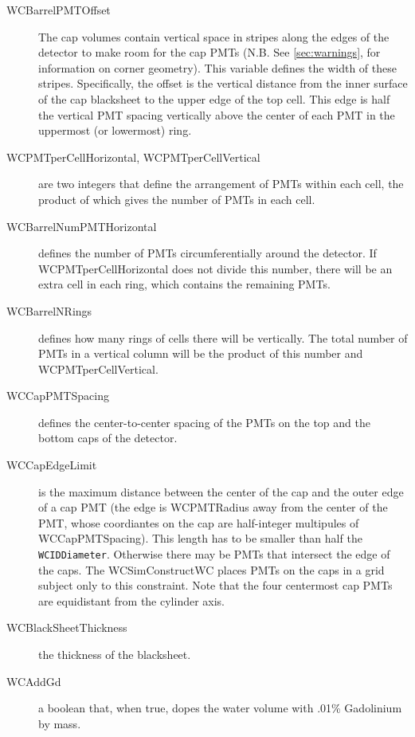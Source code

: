 \begin{description}
\item[WCBarrelPMTOffset] The cap volumes contain vertical space in stripes along the edges of the detector to make room for the cap PMTs (N.B.  See \ref{sec:warnings}, for information on corner geometry). This variable defines the width of these stripes.  Specifically, the offset is the vertical distance from the inner surface of the cap blacksheet to the upper edge of the top cell.  This edge is half the vertical PMT spacing vertically above the center of each PMT in the uppermost (or lowermost) ring.

\item[WCPMTperCellHorizontal, WCPMTperCellVertical] are two integers that define the arrangement of PMTs within each cell, the product of which gives the number of PMTs in each cell.

\item[WCBarrelNumPMTHorizontal] defines the number of PMTs circumferentially around the detector. If WCPMTperCellHorizontal does not divide this number, there will be an extra cell in each ring, which contains the remaining PMTs.

\item[WCBarrelNRings] defines how many rings of cells there will be vertically.  The total number of PMTs in a vertical column will be the product of this number and WCPMTperCellVertical.

\item[WCCapPMTSpacing] defines the center-to-center spacing of the PMTs on the top and the bottom caps of the detector.

\item[WCCapEdgeLimit] is the maximum distance between the center of the cap and the outer edge of a cap PMT (the edge is WCPMTRadius away from the center of the PMT, whose coordiantes on the cap are half-integer multipules of WCCapPMTSpacing). This length has to be smaller than half the \texttt{WCIDDiameter}. Otherwise there may be PMTs that intersect the edge of the caps.  The WCSimConstructWC places PMTs on the caps in a grid subject only to this constraint.  Note that the four centermost cap PMTs are equidistant from the cylinder axis.

\item[WCBlackSheetThickness] the thickness of the blacksheet.

\item[WCAddGd] a boolean that, when true, dopes the water volume with .01\% Gadolinium by mass.
\end {description}

